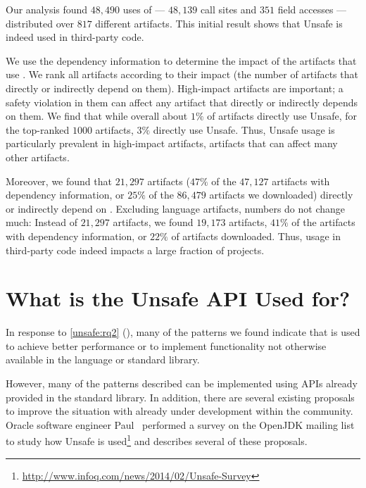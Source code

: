 Our analysis found $48,490$ uses of  --- $48,139$ call sites and $351$ field accesses --- distributed over $817$ different artifacts.
This initial result shows that Unsafe is indeed used in third-party code.

We use the dependency information to determine the impact of the artifacts that use .
We rank all artifacts according to their impact (the number of artifacts that directly or indirectly depend on them).
High-impact artifacts are important;
a safety violation in them can affect any artifact that directly or indirectly depends on them.
We find that while overall about $1\%$ of artifacts directly use Unsafe,
for the top-ranked $1000$ artifacts, $3\%$ directly use Unsafe.
Thus, Unsafe usage is particularly prevalent in high-impact artifacts, artifacts that can affect many other artifacts.

Moreover, we found that $21,297$ artifacts ($47\%$ of the $47,127$ artifacts with dependency information, or $25\%$ of the $86,479$ artifacts we downloaded) directly or indirectly depend on .
Excluding language artifacts, numbers do not change much:
Instead of $21,297$ artifacts, we found $19,173$ artifacts,
$41\%$ of the artifacts with dependency information, or $22\%$ of artifacts downloaded.
Thus,  usage in third-party code indeed impacts a large fraction of projects.


\section{What is the Unsafe API Used for?}
\label{sec:unsafe:discussion}

In response to \ref{unsafe:rq2} (\emph{\urqB}),
many of the patterns we found indicate that \unsafe{} is used to achieve 
better performance or to implement functionality not otherwise available in the \java{} language or standard library.

However, many of the patterns described can be implemented using APIs
already provided in the \java{} standard library. 
In addition, there are several existing proposals to improve the situation
with \unsafe{} already under development within the \java{} community.
Oracle software engineer Paul~\cite{psandoz14} performed a survey on
the OpenJDK mailing list to
study how Unsafe is
used\footnote{\url{http://www.infoq.com/news/2014/02/Unsafe-Survey}} and
describes several of these proposals.



